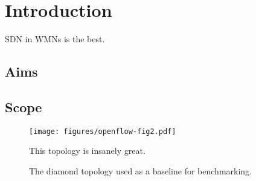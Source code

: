 \chapter{Introduction}

SDN in WMNs is the best.

\section{Aims}

\section{Scope}

\begin{figure}
    \begin{center}
        \texttt{[image: figures/openflow-fig2.pdf]}
        \caption{The diamond topology used as a baseline for benchmarking.} This topology is insanely great.
    \end{center}
\end{figure}
